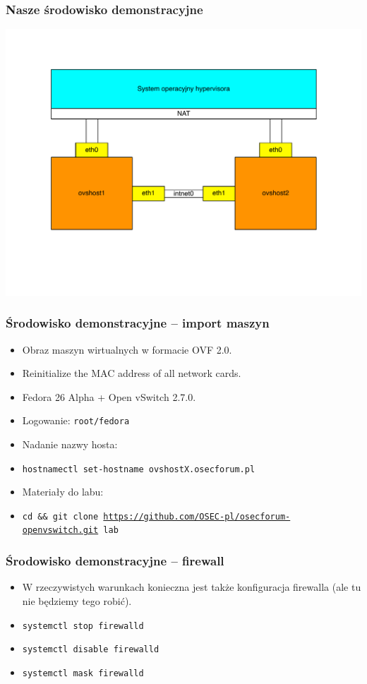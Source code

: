 \documentclass[dvipsnames,table]{beamer}
\begin{document}
\begin{frame}
\frametitle{Nasze środowisko demonstracyjne}
\includegraphics[width=1.00\textwidth]{img-labenv.pdf}

\end{frame}

\begin{frame}
\frametitle{Środowisko demonstracyjne -- import maszyn}
\begin{itemize}
	\item Obraz maszyn wirtualnych w formacie OVF 2.0.
	\item Reinitialize the MAC address of all network cards.
	\item Fedora 26 Alpha + Open vSwitch 2.7.0.
	\item Logowanie: {\tt root/fedora}
	\item Nadanie nazwy hosta:
	\item {\tt hostnamectl set-hostname ovshostX.osecforum.pl}
	\item Materiały do labu:
	\item {\tt cd \&\& git clone \href{https://github.com/OSEC-pl/osecforum-openvswitch.git}{https://github.com/OSEC-pl/osecforum-openvswitch.git} lab}
\end{itemize}
\end{frame}

\begin{frame}
\frametitle{Środowisko demonstracyjne -- firewall}
\begin{itemize}
	\item W rzeczywistych warunkach konieczna jest także konfiguracja firewalla (ale tu nie będziemy tego robić).
	\item {\tt systemctl stop firewalld}
	\item {\tt systemctl disable firewalld}
	\item {\tt systemctl mask firewalld}
\end{itemize}
\end{frame}
\end{document}
